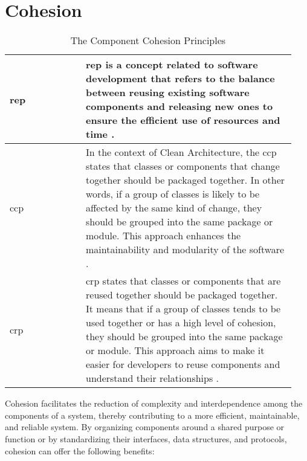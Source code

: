 \chapter{Cohesion} \label{appendix_cohesion_principles}

\begin{table}[H]
    \begin{tabular}{ p{0.25\linewidth} | p{0.69\linewidth}}
        \toprule
        \acrlong{rep} & \acrshort{rep} is a concept related to software development that
        refers to the balance between reusing existing software components and releasing
        new ones to ensure the efficient use of resources and time
        \parencite[119]{robert_c_martin_clean_2018}.\\ \midrule 
        
        \acrlong{ccp} & In the context of Clean Architecture, the \acrshort{ccp} states
        that classes or components that change together should be packaged together. In
        other words, if a group of classes is likely to be affected by the same kind of
        change, they should be grouped into the same package or module. This approach
        enhances the maintainability and modularity of the software
        \parencite[120]{robert_c_martin_clean_2018}.\\ \midrule 
        
        \acrlong{crp} & \acrshort{crp} states that classes or components that are reused
        together should be packaged together. It means that if a group of classes tends to
        be used together or has a high level of cohesion, they should be grouped into the
        same package or module. This approach aims to make it easier for developers to
        reuse components and understand their relationships
        \parencite[121]{robert_c_martin_clean_2018}.\\

        \bottomrule
    \end{tabular}
    \caption{The Component Cohesion Principles}
    \label{appendix_tab_cohesion_principles}
\end{table}

Cohesion facilitates the reduction of complexity and interdependence among the components
of a system, thereby contributing to a more efficient, maintainable, and reliable system.
By organizing components around a shared purpose or function or by standardizing their
interfaces, data structures, and protocols, cohesion can offer the following benefits:

